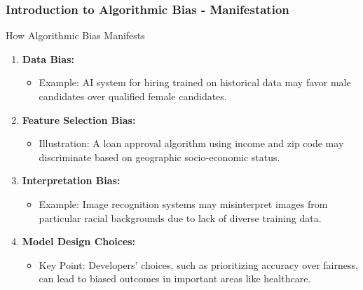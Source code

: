 \documentclass{beamer}
\begin{document}
\begin{frame}[fragile]
    \frametitle{Introduction to Algorithmic Bias - Manifestation}
    \begin{block}{How Algorithmic Bias Manifests}
        \begin{enumerate}
            \item \textbf{Data Bias:}
            \begin{itemize}
                \item Example: AI system for hiring trained on historical data may favor male candidates over qualified female candidates.
            \end{itemize}
            
            \item \textbf{Feature Selection Bias:}
            \begin{itemize}
                \item Illustration: A loan approval algorithm using income and zip code may discriminate based on geographic socio-economic status.
            \end{itemize}
            
            \item \textbf{Interpretation Bias:}
            \begin{itemize}
                \item Example: Image recognition systems may misinterpret images from particular racial backgrounds due to lack of diverse training data.
            \end{itemize}
            
            \item \textbf{Model Design Choices:}
            \begin{itemize}
                \item Key Point: Developers' choices, such as prioritizing accuracy over fairness, can lead to biased outcomes in important areas like healthcare.
            \end{itemize}
        \end{enumerate}
    \end{block}
\end{frame}
\end{document}
